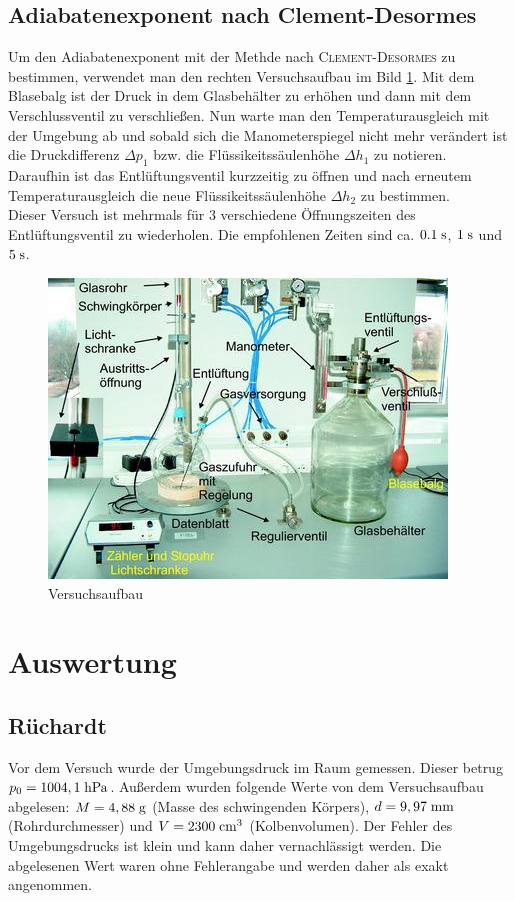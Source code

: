 \documentclass[12pt, a4paper, twoside]{scrartcl}
\newcommand{\person}[1]{\textsc{#1}}
\begin{document}
\subsection{Adiabatenexponent nach Clement-Desormes}
Um den Adiabatenexponent mit der Methde nach \person{Clement-Desormes} zu bestimmen, verwendet man den rechten Versuchsaufbau im Bild \ref{fig:aufbau}.
Mit dem Blasebalg ist der Druck in dem Glasbehälter zu erhöhen und dann mit dem Verschlussventil zu verschließen.
Nun warte man den Temperaturausgleich mit der Umgebung ab und sobald sich die Manometerspiegel nicht mehr verändert ist die Druckdifferenz $\Delta p_1$ bzw. die Flüssikeitssäulenhöhe $\Delta h_1$ zu notieren.
Daraufhin ist das Entlüftungsventil kurzzeitig zu öffnen und nach erneutem Temperaturausgleich die neue Flüssikeitssäulenhöhe $\Delta h_2$ zu bestimmen.\\
Dieser Versuch ist mehrmals für 3 verschiedene Öffnungszeiten des Entlüftungsventil zu wiederholen. Die empfohlenen Zeiten sind ca. $0.1\sekunde$, $1\sekunde$ und $5\sekunde$.

\begin{figure}[!h]
 \centering
 \includegraphics[scale=1.0]{aufbau.png}
 \caption{\label{fig:aufbau}Versuchsaufbau\protect\footnotemark}
\end{figure}

\section{Auswertung}
\label{sec:auswertung}

\subsection{Rüchardt}
Vor dem Versuch wurde der Umgebungsdruck im Raum gemessen. Dieser betrug $p_0=1004,1\hecto\pascal$. Außerdem wurden folgende Werte von dem Versuchsaufbau abgelesen: $M=4,88\gramm$ (Masse des schwingenden Körpers), $d=9,97\milli\meter$ (Rohrdurchmesser) und $V=2300\centi\meter^3$ (Kolbenvolumen). Der Fehler des Umgebungsdrucks ist klein und kann daher vernachlässigt werden. Die abgelesenen Wert waren ohne Fehlerangabe und werden daher als exakt angenommen.\\
\end{document}
